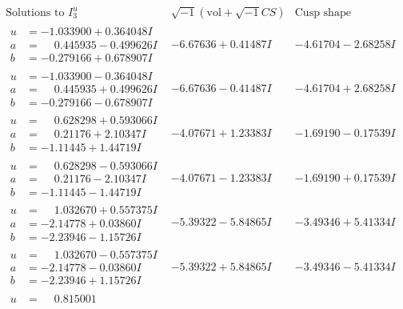 \documentclass[1p]{elsarticle_modified}
\theoremstyle{definition}
\newcommand{\I}{\sqrt{-1}}
\begin{document}
$$\begin{array}{c|c|c}  
\text{Solutions to }I^u_{3}& \I (\text{vol} + \sqrt{-1}CS) & \text{Cusp shape}\\
 \hline 
\begin{aligned}
u &= -1.033900 + 0.364048 I \\
a &= \phantom{-}0.445935 - 0.499626 I \\
b &= -0.279166 + 0.678907 I\end{aligned}
 & -6.67636 + 0.41487 I & -4.61704 - 2.68258 I \\ \hline\begin{aligned}
u &= -1.033900 - 0.364048 I \\
a &= \phantom{-}0.445935 + 0.499626 I \\
b &= -0.279166 - 0.678907 I\end{aligned}
 & -6.67636 - 0.41487 I & -4.61704 + 2.68258 I \\ \hline\begin{aligned}
u &= \phantom{-}0.628298 + 0.593066 I \\
a &= \phantom{-}0.21176 + 2.10347 I \\
b &= -1.11445 + 1.44719 I\end{aligned}
 & -4.07671 + 1.23383 I & -1.69190 - 0.17539 I \\ \hline\begin{aligned}
u &= \phantom{-}0.628298 - 0.593066 I \\
a &= \phantom{-}0.21176 - 2.10347 I \\
b &= -1.11445 - 1.44719 I\end{aligned}
 & -4.07671 - 1.23383 I & -1.69190 + 0.17539 I \\ \hline\begin{aligned}
u &= \phantom{-}1.032670 + 0.557375 I \\
a &= -2.14778 + 0.03860 I \\
b &= -2.23946 - 1.15726 I\end{aligned}
 & -5.39322 - 5.84865 I & -3.49346 + 5.41334 I \\ \hline\begin{aligned}
u &= \phantom{-}1.032670 - 0.557375 I \\
a &= -2.14778 - 0.03860 I \\
b &= -2.23946 + 1.15726 I\end{aligned}
 & -5.39322 + 5.84865 I & -3.49346 - 5.41334 I \\ \hline\begin{aligned}
u &= \phantom{-}0.815001\phantom{ +0.000000I} \\

\end{aligned}
\end{array}$$
\end{document}
